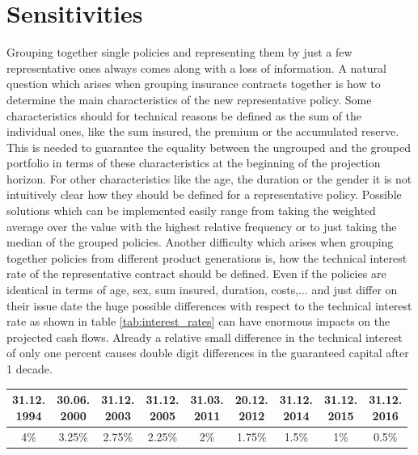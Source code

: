 

\chapter{Sensitivities}
\label{cha:sensitivities}

Grouping together single policies and representing them by just a few representative ones always comes along with a loss of information. A natural question which arises when grouping insurance contracts together is how to determine the main characteristics of the new representative policy. Some characteristics should for technical reasons be defined as the sum of the individual ones, like the sum insured, the premium or the accumulated reserve. This is needed to guarantee the equality between the ungrouped and the grouped portfolio in terms of these characteristics at the beginning of the projection horizon. For other characteristics like the age, the duration or the gender it is not intuitively clear how they should be defined for a representative policy. Possible solutions which can be implemented easily range from taking the weighted average over the value with the highest relative frequency or to just taking the median of the grouped policies. Another difficulty which arises when grouping together policies from different product generations is, how the technical interest rate of the representative contract should be defined. Even if the policies are identical in terms of age, sex, sum insured, duration, costs,... and just differ on their issue date the huge possible differences with respect to the technical interest rate as shown in table \ref{tab:interest_rates} can have enormous impacts on the projected cash flows. 
Already a relative small difference in the technical interest of only one percent causes double digit differences in the guaranteed capital after 1 decade. 

\begin{minipage}{\linewidth}
	\centering
	\begin{tabular}{*{9}{c}}
	\toprule
	\makecell{31.12.\\1994} & \makecell{30.06.\\2000} & \makecell{31.12.\\2003} & \makecell{31.12.\\2005} & 				\makecell{31.03.\\2011}  & \makecell{20.12.\\2012} & \makecell{31.12.\\2014} & \makecell{31.12.\\2015} & 				\makecell{31.12.\\2016}\\
	\midrule
	4\% & 3.25\% & 2.75\% & 2.25\% & 2\% & 1.75\% & 1.5\% & 1\% & 0.5\% \\
	\bottomrule
	\end{tabular}
	\label{tab:interest_rates}
\end{minipage}

